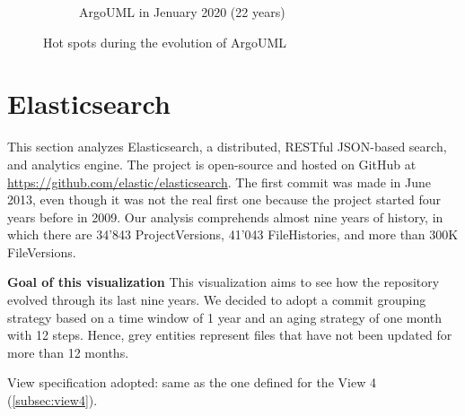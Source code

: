 \begin{figure}[ht]
\begin{subfigure}{0.48\textwidth}
        \caption{ArgoUML in Jenuary 2020 (22 years)} 
        \label{fig:ArgoUML_V3_S6}
    \end{subfigure}
    
    \caption{Hot spots during the evolution of ArgoUML} 
    \label{fig:JetUML_V3}
\end{figure}
\clearpage

\section{Elasticsearch}
This section analyzes Elasticsearch, a distributed, RESTful JSON-based search, and analytics engine. 
The project is open-source and hosted on GitHub at \url{https://github.com/elastic/elasticsearch}. 
The first commit was made in June 2013, even though it was not the real first one because the project started four years before in 2009. 
Our analysis comprehends almost nine years of history, in which there are 34'843 ProjectVersions, 41'043 FileHistories, and more than 300K FileVersions. 

\textbf{Goal of this visualization}
This visualization aims to see how the repository evolved through its last nine years. We decided to adopt a commit grouping strategy based on a time window of 1 year and an aging strategy of one month with 12 steps. Hence, grey entities represent files that have not been updated for more than 12 months. 

\bigbreak
View specification adopted: same as the one defined for the View 4 (\autoref{subsec:view4}).

